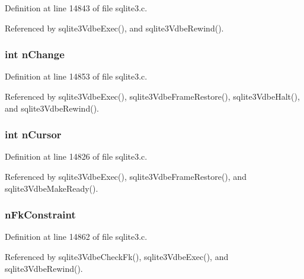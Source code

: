 Definition at line 14843 of file sqlite3.\+c.



Referenced by sqlite3\+Vdbe\+Exec(), and sqlite3\+Vdbe\+Rewind().

\hypertarget{struct_vdbe_a34a2d05071fd1eb026579e78343912a4}{}
\subsubsection[{n\+Change}]{\setlength{\rightskip}{0pt plus 5cm}int n\+Change}\label{struct_vdbe_a34a2d05071fd1eb026579e78343912a4}


Definition at line 14853 of file sqlite3.\+c.



Referenced by sqlite3\+Vdbe\+Exec(), sqlite3\+Vdbe\+Frame\+Restore(), sqlite3\+Vdbe\+Halt(), and sqlite3\+Vdbe\+Rewind().

\hypertarget{struct_vdbe_abd18ebaf2ce9128e5e45bd424af27002}{}
\subsubsection[{n\+Cursor}]{\setlength{\rightskip}{0pt plus 5cm}int n\+Cursor}\label{struct_vdbe_abd18ebaf2ce9128e5e45bd424af27002}


Definition at line 14826 of file sqlite3.\+c.



Referenced by sqlite3\+Vdbe\+Exec(), sqlite3\+Vdbe\+Frame\+Restore(), and sqlite3\+Vdbe\+Make\+Ready().

\hypertarget{struct_vdbe_a707c750263dd956c65db6c5c7d316af8}{}
\subsubsection[{n\+Fk\+Constraint}]{ n\+Fk\+Constraint}\label{struct_vdbe_a707c750263dd956c65db6c5c7d316af8}


Definition at line 14862 of file sqlite3.\+c.



Referenced by sqlite3\+Vdbe\+Check\+Fk(), sqlite3\+Vdbe\+Exec(), and sqlite3\+Vdbe\+Rewind().

\hypertarget{struct_vdbe_af29664edee858108ea51968053f5fc3c}{}

